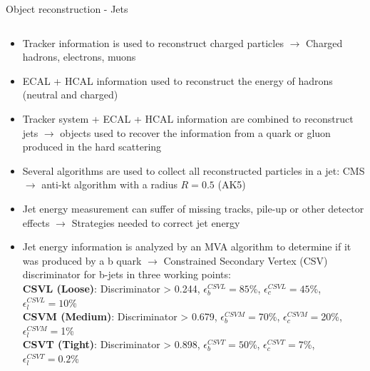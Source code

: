 \begin{frame}{Object reconstruction - Jets}
\vspace{-.9cm}

\begin{columns}
\begin{column}{.55\textwidth}
\begin{block}{}
\begin{itemize}\tiny
\item Tracker information is used to reconstruct charged particles $\to$ Charged hadrons, electrons, muons
\item ECAL + HCAL information used to reconstruct the energy of hadrons (neutral and charged)
\item Tracker system + ECAL + HCAL information are combined to reconstruct jets $\to$ objects used to recover the information from a quark or gluon produced in the hard scattering
\item Several algorithms are used to collect all reconstructed particles in a jet: CMS $\to$ anti-kt algorithm with a radius $R=0.5$ (AK5)
\item Jet energy measurement can suffer of missing tracks, pile-up or other detector effects $\to$ Strategies needed to correct jet energy 
\item Jet energy information is analyzed by an MVA algorithm to determine if it was produced by a b quark $\to$ Constrained Secondary Vertex (CSV) discriminator for b-jets in three working points:\\
\tiny{
\textbf{CSVL (Loose)}: Discriminator > 0.244, $\epsilon^{CSVL}_{b}=85$\%, $\epsilon^{CSVL}_{c}=45$\%, $\epsilon^{CSVL}_{l}=10$\%\\
\textbf{CSVM (Medium)}: Discriminator > 0.679, $\epsilon^{CSVM}_{b}=$70\%, $\epsilon^{CSVM}_{c}=$20\%, $\epsilon^{CSVM}_{l}=$1\%\\
\textbf{CSVT (Tight)}: Discriminator > 0.898, $\epsilon^{CSVT}_{b}=50$\%, $\epsilon^{CSVT}_{c}=7$\%, $\epsilon^{CSVT}_{l}=0.2$\%\\
}%
\end{itemize}
\end{block}
\end{column}


\end{columns}
\end{frame}
